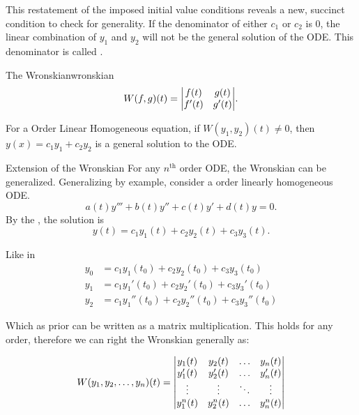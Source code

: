 \documentclass[../notes.tex]{subfiles}
\begin{document}
This restatement of the imposed initial value conditions reveals a new, succinct condition to check for generality. If the denominator of either $c_1$ or $c_2$ is 0, the linear combination of $y_1$ and $y_2$ will not be the general solution of the ODE. This denominator is called .

\begin{theorem}{The Wronskian}{wronskian}
				\[
								W(f,g)(t) = \mqty|
												f(t) & g(t) \\
												f'(t) & g'(t) |
				.\]

				For a  Order Linear Homogeneous equation, if $W(y_1,y_2)(t)\neq0$, then $y(x) = c_1 y_1 + c_2 y_2$ is a general solution to the ODE.
\end{theorem}

\begin{stickynote}{Extension of the Wronskian}
				For any $n^{\text{th}}$ order ODE, the Wronskian can be generalized. Generalizing by example, consider a  order linearly homogeneous ODE.
				\[
				a(t)y''' + b(t)y'' + c(t)y' + d(t)y = 0
				.\]
By the , the solution is
\[
y(t) = c_1 y_1(t) + c_2 y_2(t) + c_3 y_3(t)
.\]

Like in 
\begin{align*}
				y_0 &= c_1 y_1(t_0) + c_2 y_2(t_0) + c_3 y_3(t_0) \\
				y_1  &= c_1 y_1'(t_0) + c_2 y_2'(t_0) + c_3 y_3'(t_0) \\
				y_2  &= c_1 y_1''(t_0) + c_2 y_2''(t_0) + c_3 y_3''(t_0)
\end{align*}

Which as prior can be written as a matrix multiplication. This holds for any order, therefore we can right the Wronskian generally as:

\[
W(y_1,y_2,\ldots,y_n)(t) =
\mqty|
y_1(t) & y_2(t) & \ldots & y_n (t) \\
y_1'(t) & y_2'(t) & \ldots & y_n'(t) \\
\vdots & \vdots & \ddots & \vdots \\
y_1^{n}(t) & y_2^{n}(t) & \ldots & y_n^{n}(t) \\
|
\]

\end{stickynote}
\end{document}
